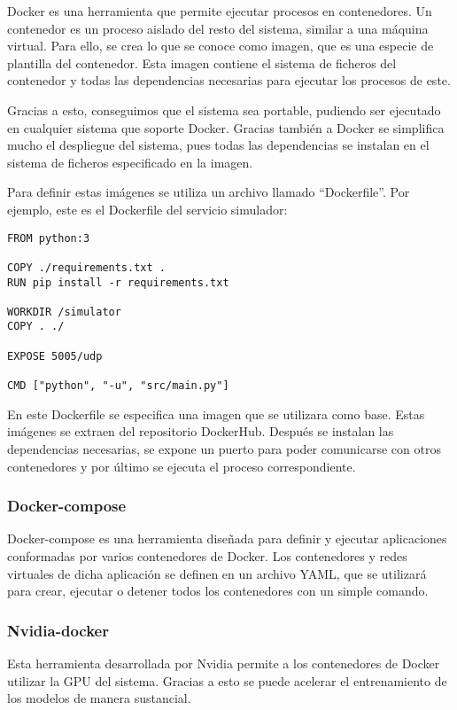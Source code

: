 Docker \cite{docker-pag} es una herramienta que permite ejecutar procesos en contenedores. Un contenedor es un proceso aislado del 
resto del sistema, similar a una máquina virtual. Para ello, se crea lo que se conoce como imagen, que es una especie 
de plantilla del contenedor. Esta imagen contiene el sistema de ficheros del contenedor y todas las dependencias 
necesarias para ejecutar los procesos de este.

Gracias a esto, conseguimos que el sistema sea portable, pudiendo ser ejecutado en cualquier sistema que soporte 
Docker. Gracias también a Docker se simplifica mucho el despliegue del sistema, pues todas las dependencias 
se instalan en el sistema de ficheros especificado en la imagen.

Para definir estas imágenes se utiliza un archivo llamado ``Dockerfile''. Por ejemplo, este es el Dockerfile del 
servicio simulador:
\begin{lstlisting}
FROM python:3

COPY ./requirements.txt .
RUN pip install -r requirements.txt

WORKDIR /simulator
COPY . ./

EXPOSE 5005/udp

CMD ["python", "-u", "src/main.py"]
\end{lstlisting}

En este Dockerfile se especifica una imagen que se utilizara como base. Estas imágenes se extraen del repositorio 
DockerHub. Después se instalan las dependencias necesarias, se expone un puerto para poder comunicarse con otros 
contenedores y por último se ejecuta el proceso correspondiente.

\subsubsection*{Docker-compose}

Docker-compose \cite{compose} es una herramienta diseñada para definir y ejecutar aplicaciones conformadas por varios contenedores
de Docker. Los contenedores y redes virtuales de dicha aplicación se definen en un archivo YAML, que se utilizará 
para crear, ejecutar o detener todos los contenedores con un simple comando.

\subsubsection*{Nvidia-docker}

Esta herramienta \cite{nvidia-docker} desarrollada por Nvidia permite a los contenedores de Docker utilizar la GPU del sistema. Gracias
a esto se puede acelerar el entrenamiento de los modelos de manera sustancial.

